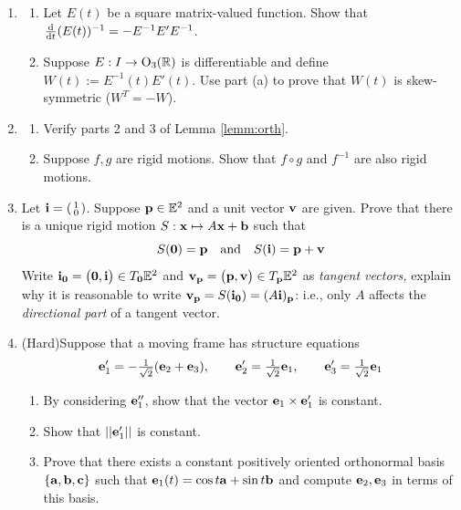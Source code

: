 \begin{exercises}
\begin{enumerate}
	  
	  \item\begin{enumerate}
	    \item Let $E(t)$ be a square matrix-valued function. Show that $\frac{\mathrm{d} }{\mathrm{d} t}(E(t))^{-1}=-E^{-1}E'E^{-1}$.
			\item Suppose $E:I\to \mathrm{O}_3(\mathbb{R})$ is differentiable and define $W(t):=E^{-1}(t)E'(t)$. Use part (a) to prove that $W(t)$ is skew-symmetric ($W^T=-W$).
	  \end{enumerate}
	  
	  
	  \item\begin{enumerate}
	    \item Verify parts 2 and 3 of Lemma \ref{lemm:orth}.
	    \item Suppose $f,g$ are rigid motions. Show that $f\circ g$ and $f^{-1}$ are also rigid motions.
	  \end{enumerate}
	  
	  
	  \item\label{exs:tanvecrigid} Let ${\mathbf{i}}=\left(\begin{smallmatrix}1\\0\end{smallmatrix}\right)$. Suppose ${\mathbf{p}}\in\mathbb{E}^2$ and a unit vector ${\mathbf{v}}$ are given. Prove that there is a unique rigid motion $S:{\mathbf{x}}\mapsto A{\mathbf{x}}+{\mathbf{b}}$ such that
	  \[
	  	S(\mathbf{0})={\mathbf{p}}\quad \text{and}\quad S({\mathbf{i}})={\mathbf{p}}+{\mathbf{v}}
	  \]
	  Write ${\mathbf{i}}_{\mathbf{0}}=\bigl(\mathbf{0},{\mathbf{i}}\bigr)\in T_{\mathbf{0}}\mathbb{E}^2$ and ${\mathbf{v}}_{{\mathbf{p}}}=\bigl({\mathbf{p}},{\mathbf{v}}\bigr)\in T_{{\mathbf{p}}}\mathbb{E}^2$ as \emph{tangent vectors,} explain why it is reasonable to write ${\mathbf{v}}_{{\mathbf{p}}}=S({\mathbf{i}}_{\mathbf{0}})=(A{\mathbf{i}})_{{\mathbf{p}}}$: i.e., only $A$ affects the \emph{directional part} of a tangent vector.
	  
	
		\item (Hard)\quad Suppose that a moving frame has structure equations 
		\[
			{\mathbf{e}}'_1=-\tfrac 1{\sqrt 2}({\mathbf{e}}_2+{\mathbf{e}}_3),\qquad{\mathbf{e}}'_2=\tfrac 1{\sqrt 2}{\mathbf{e}}_1,\qquad{\mathbf{e}}'_3=\tfrac 1{\sqrt 2}{\mathbf{e}}_1
		\]
		\begin{enumerate}
		  \item By considering ${\mathbf{e}}_1''$, show that the vector ${\mathbf{e}}_1\times{\mathbf{e}}_1'$ is constant.
		  \item Show that $\left| \left| {\mathbf{e}}_1'\right|\right|$ is constant.
		  \item Prove that there exists a constant positively oriented orthonormal basis $\{{\mathbf{a}},{\mathbf{b}},{\mathbf{c}}\}$ such that ${\mathbf{e}}_1(t)=\cos t{\mathbf{a}}+\sin t{\mathbf{b}}$ and compute ${\mathbf{e}}_2,{\mathbf{e}}_3$ in terms of this basis.
		\end{enumerate}
	
	\end{enumerate}
\end{exercises}

